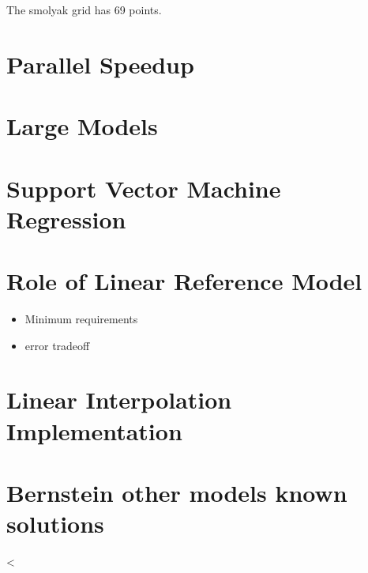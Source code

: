 \documentclass[12pt]{article}
\begin{document}
The smolyak grid has 69 points.

\section{Parallel Speedup}
\label{sec:parallel-speedup}

\section{Large Models}
\label{sec:large-models}


\section{Support Vector Machine Regression}
\label{sec:supp-vect-mach}

\section{Role of Linear Reference Model}
\label{sec:role-line-refer}

\begin{itemize}
\item Minimum requirements
\item error tradeoff
\end{itemize}

\section{Linear Interpolation Implementation}
\label{sec:line-interp-impl}


\section{Bernstein other models known solutions}
\label{sec:bernst-other-models}


  
<
\end{document}
